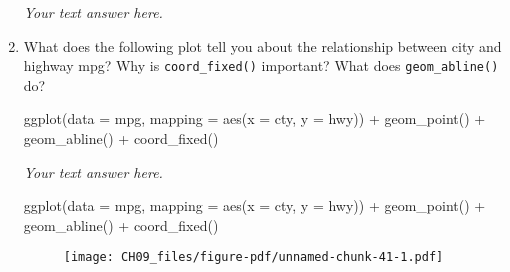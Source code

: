 \documentclass[
  letterpaper,
  DIV=11,
  numbers=noendperiod]{scrreprt}
\newenvironment{Shaded}{\begin{snugshade}}{\end{snugshade}}
\newcommand{\AttributeTok}[1]{\textcolor[rgb]{0.40,0.45,0.13}{#1}}
\newcommand{\FunctionTok}[1]{\textcolor[rgb]{0.28,0.35,0.67}{#1}}
\newcommand{\NormalTok}[1]{\textcolor[rgb]{0.00,0.23,0.31}{#1}}
\newcommand{\SpecialCharTok}[1]{\textcolor[rgb]{0.37,0.37,0.37}{#1}}
\begin{document}
\begin{enumerate}
\begin{tcolorbox}
  \emph{Your text answer here.}

  \end{tcolorbox}
\item
  What does the following plot tell you about the relationship between
  city and highway mpg? Why is \texttt{coord\_fixed()} important? What
  does \texttt{geom\_abline()} do?

\begin{Shaded}
\begin{Highlighting}[]
\FunctionTok{ggplot}\NormalTok{(}\AttributeTok{data =}\NormalTok{ mpg, }\AttributeTok{mapping =} \FunctionTok{aes}\NormalTok{(}\AttributeTok{x =}\NormalTok{ cty, }\AttributeTok{y =}\NormalTok{ hwy)) }\SpecialCharTok{+}
  \FunctionTok{geom\_point}\NormalTok{() }\SpecialCharTok{+} 
  \FunctionTok{geom\_abline}\NormalTok{() }\SpecialCharTok{+}
  \FunctionTok{coord\_fixed}\NormalTok{()}
\end{Highlighting}
\end{Shaded}

  \begin{tcolorbox}[enhanced jigsaw, left=2mm, rightrule=.15mm, bottomtitle=1mm, opacitybacktitle=0.6, leftrule=.75mm, opacityback=0, colframe=quarto-callout-note-color-frame, bottomrule=.15mm, coltitle=black, toptitle=1mm, colback=white, titlerule=0mm, colbacktitle=quarto-callout-note-color!10!white, title={Answer}, toprule=.15mm, breakable, arc=.35mm]

  \emph{Your text answer here.}

\begin{Shaded}
\begin{Highlighting}[]
\FunctionTok{ggplot}\NormalTok{(}\AttributeTok{data =}\NormalTok{ mpg, }\AttributeTok{mapping =} \FunctionTok{aes}\NormalTok{(}\AttributeTok{x =}\NormalTok{ cty, }\AttributeTok{y =}\NormalTok{ hwy)) }\SpecialCharTok{+}
  \FunctionTok{geom\_point}\NormalTok{() }\SpecialCharTok{+} 
  \FunctionTok{geom\_abline}\NormalTok{() }\SpecialCharTok{+}
  \FunctionTok{coord\_fixed}\NormalTok{()}
\end{Highlighting}
\end{Shaded}

  \begin{figure}[H]

  {\centering \texttt{[image: CH09\_files/figure-pdf/unnamed-chunk-41-1.pdf]}

  }

  \end{figure}

  \end{tcolorbox}
\end{enumerate}
\end{document}
